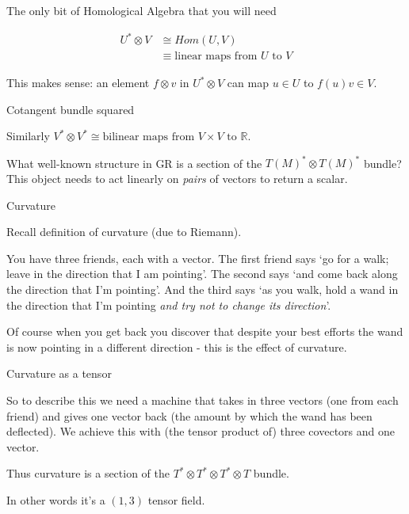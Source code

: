 \documentclass{beamer}
\begin{document}
\begin{frame}{The only bit of Homological Algebra that you will need}

\begin{equation*}
\begin{split}
U^* \otimes V & \cong Hom(U, V) \\
& \equiv \text{linear maps from $U$ to $V$}
\end{split}
\end{equation*}

This makes sense: an element $f \otimes v$ in $U^* \otimes V$ can map $u \in U$ to $f(u) v \in V$.

\end{frame}

\begin{frame}{Cotangent bundle squared}

Similarly $V^* \otimes V^* \cong \text{bilinear maps from } V \times V \text{ to } \mathbb{R}$.

What well-known structure in GR is a section of the $T(M)^* \otimes T(M)^*$ bundle? This object needs to act linearly on \textit{pairs} of vectors to return a scalar.

\end{frame}

\begin{frame}{Curvature}

Recall definition of curvature (due to Riemann).

You have three friends, each with a vector. The first friend says `go for a walk; leave in the direction that I am pointing'. The second says `and come back along the direction that I'm pointing'. And the third says `as you walk, hold a wand in the direction that I'm pointing \textit{and try not to change its direction}'.

Of course when you get back you discover that despite your best efforts the wand is now pointing in a different direction - this is the effect of curvature.

\end{frame}

\begin{frame}{Curvature as a tensor}

So to describe this we need a machine that takes in three vectors (one from each friend) and gives one vector back (the amount by which the wand has been deflected). We achieve this with (the tensor product of) three covectors and one vector.

Thus curvature is a section of the $T^* \otimes T^* \otimes T^* \otimes T$ bundle.

 In other words it's a $(1,3)$ tensor field.

\end{frame}
\end{document}
